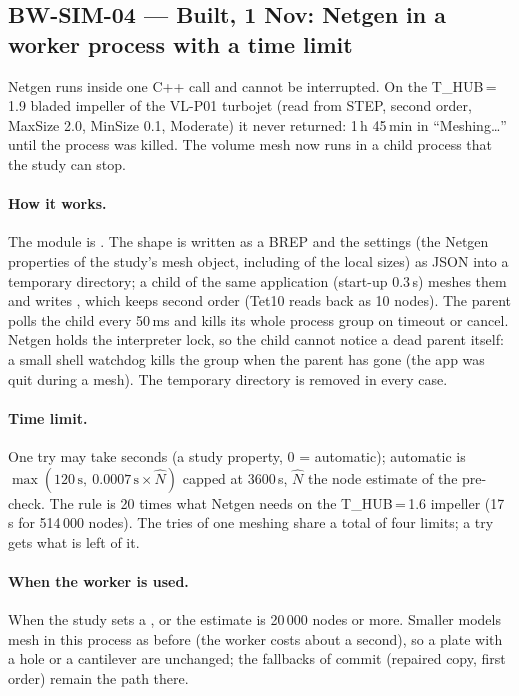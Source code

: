 \subsection{BW-SIM-04 --- Built, 1 Nov: Netgen in a worker process with a time limit}\label{sec:sim-mesh-worker-built}

Netgen runs inside one C++ call and cannot be interrupted. On the T\_HUB\,=\,1.9 bladed impeller of the VL-P01 turbojet
(read from STEP, second order, MaxSize 2.0, MinSize 0.1, Moderate) it never returned: 1\,h 45\,min in ``Meshing\ldots''
until the process was killed. The volume mesh now runs in a child process that the study can stop.

\paragraph{How it works.} The module is . The shape is written as a BREP and the
settings (the Netgen properties of the study's mesh object, including  of the local sizes) as JSON into a
temporary directory; a child  of the same application (start-up 0.3\,s) meshes them and writes
, which keeps second order (Tet10 reads back as 10 nodes). The parent polls the child every 50\,ms and kills
its whole process group on timeout or cancel. Netgen holds the interpreter lock, so the child cannot notice a dead
parent itself: a small shell watchdog kills the group when the parent has gone (the app was quit during a mesh). The
temporary directory is removed in every case.

\paragraph{Time limit.} One try may take  seconds (a study property, 0 = automatic); automatic is
$\max(120\,\mathrm{s},\ 0.0007\,\mathrm{s}\times\hat N)$ capped at 3600\,s, $\hat N$ the node estimate of the pre-check. The
rule is 20 times what Netgen needs on the T\_HUB\,=\,1.6 impeller (17\,s for 514\,000 nodes). The tries of one meshing share
a total of four limits; a try gets what is left of it.

\paragraph{When the worker is used.} When the study sets a , or the estimate is 20\,000 nodes or more.
Smaller models mesh in this process as before (the worker costs about a second), so a plate with a hole or a cantilever are
unchanged; the fallbacks of commit  (repaired copy, first order) remain the path there.

